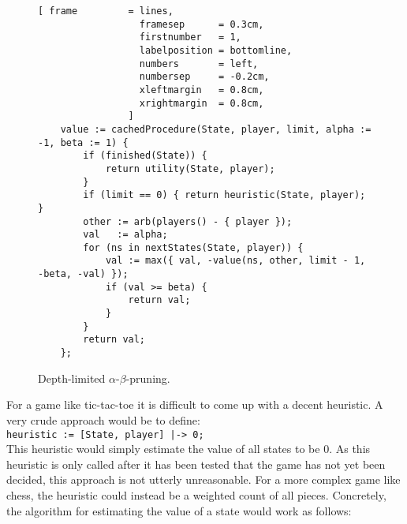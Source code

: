 \begin{figure}[!ht]
\centering
\begin{Verbatim}[ frame         = lines, 
                  framesep      = 0.3cm, 
                  firstnumber   = 1,
                  labelposition = bottomline,
                  numbers       = left,
                  numbersep     = -0.2cm,
                  xleftmargin   = 0.8cm,
                  xrightmargin  = 0.8cm,
                ]
    value := cachedProcedure(State, player, limit, alpha := -1, beta := 1) {
        if (finished(State)) {
            return utility(State, player);
        }
        if (limit == 0) { return heuristic(State, player); }
        other := arb(players() - { player });
        val   := alpha;
        for (ns in nextStates(State, player)) {
            val := max({ val, -value(ns, other, limit - 1, -beta, -val) });
            if (val >= beta) {
                return val;
            }
        }
        return val;
    };
\end{Verbatim}
\vspace*{-0.3cm}
\caption{Depth-limited $\alpha$-$\beta$-pruning.}
\label{fig:game-limit.stlx}
\end{figure}
For a game like tic-tac-toe it is difficult to come up with a decent heuristic.  A very crude approach would be
to define:
\\[0.2cm]
\hspace*{1.3cm}
\texttt{heuristic := [State, player] |-> 0;}
\\[0.2cm]
This heuristic would simply estimate the value of all states to be $0$.  As this heuristic is only called after
it has been tested that the game has not yet been decided, this approach is not utterly unreasonable.  For a more
complex game like chess, the heuristic could instead be a weighted count of all pieces.  Concretely, the
algorithm for estimating the value of a state would work as follows:
